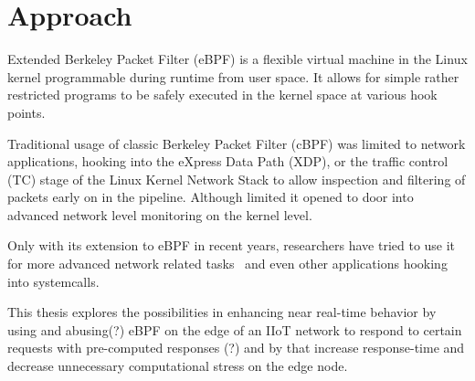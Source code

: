 \section{Approach}


Extended Berkeley Packet Filter (eBPF) is a flexible virtual machine in the
Linux kernel programmable during runtime from user space. It allows for simple
rather restricted programs to be safely executed in the kernel space at various
hook points.


Traditional usage of classic Berkeley Packet Filter (cBPF) was limited to
network applications, hooking into the eXpress Data Path (XDP), or the traffic
control (TC) stage of the Linux Kernel Network Stack to allow inspection and
filtering of packets early on in the pipeline. Although limited it opened to
door into advanced network level monitoring on the kernel level.

Only with its extension to eBPF in recent years, researchers have tried to use
it for more advanced network related tasks~\cite{miano_creating_2018} and even
other applications hooking into systemcalls.

This thesis explores the possibilities in enhancing near real-time behavior by
using and abusing(?) eBPF on the edge of an IIoT network to
respond to certain requests with pre-computed responses (?) and by that increase
response-time and decrease unnecessary computational stress on the edge node.
